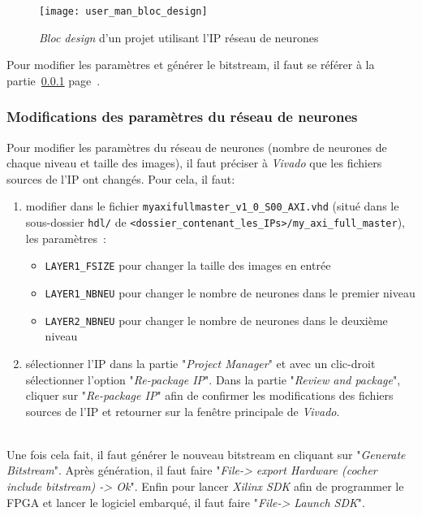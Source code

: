 \begin{figure}[h!]
	\texttt{[image: user\_man\_bloc\_design]}
	\caption{{\em Bloc design} d'un projet utilisant l'IP réseau de neurones}
	\label{fig:user_man_bloc_design}
\end{figure}

Pour modifier les paramètres et générer le bitstream, il faut se référer à la
partie~\ref{plan:user_man_modif_param}
page~\pageref{plan:user_man_modif_param}.


\subsubsection{Modifications des paramètres du réseau de neurones}
\label{plan:user_man_modif_param}

Pour modifier les paramètres du réseau de neurones (nombre de neurones de chaque
niveau et taille des images), il faut préciser à {\em Vivado} que les fichiers sources
de l'IP ont changés. Pour cela, il faut:
\begin{enumerate}
	\item modifier dans le fichier \verb+myaxifullmaster_v1_0_S00_AXI.vhd+ (situé dans le sous-dossier \verb+hdl/+ de  \verb+<dossier_contenant_les_IPs>/my_axi_full_master+), les paramètres~:
		\begin{itemize}
			\item \verb+LAYER1_FSIZE+ pour changer la taille des images en entrée
			\item \verb+LAYER1_NBNEU+ pour changer le nombre de neurones dans le premier niveau
			\item \verb+LAYER2_NBNEU+ pour changer le nombre de neurones dans le deuxième niveau
		\end{itemize}
	\item sélectionner l'IP dans la partie "{\em Project Manager}"
		et avec un clic-droit sélectionner l'option "{\em Re-package IP}".
		Dans la partie "{\em Review and package}", cliquer sur "{\em Re-package IP}" afin de confirmer
		les modifications des fichiers sources de l'IP et retourner sur la fenêtre principale de {\em Vivado}.
\end{enumerate}
~\\
Une fois cela fait, il faut générer le nouveau bitstream en cliquant sur "{\em Generate Bitstream}".
Après génération, il faut faire "{\em File-> export Hardware (cocher include bitstream) -> Ok}".
Enfin pour lancer {\em Xilinx SDK} afin de programmer le FPGA et lancer le logiciel embarqué, il faut faire "{\em File-> Launch SDK}".



